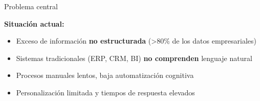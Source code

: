 \documentclass[10pt,aspectratio=169]{beamer}
\begin{document}
\begin{frame}{Problema central}
    \begin{center}
    \end{center}
    \vspace{0.3cm}
    \textbf{\textcolor{azulPrincipal}{Situación actual:}}
    \begin{itemize}
        \item Exceso de información \textbf{no estructurada} (>80\% de los datos empresariales)
        \item Sistemas tradicionales (ERP, CRM, BI) \textbf{no comprenden} lenguaje natural
        \item Procesos manuales lentos, baja automatización cognitiva
        \item Personalización limitada y tiempos de respuesta elevados
    \end{itemize}
\end{frame}
\end{document}
